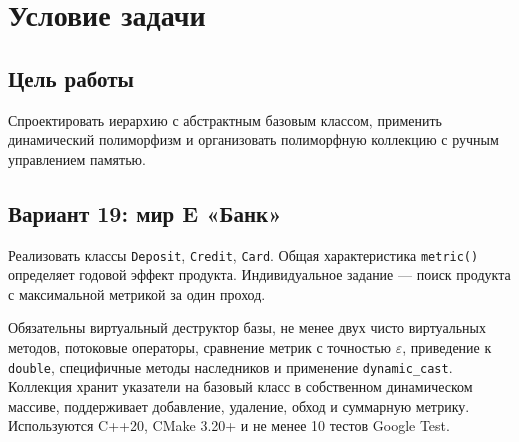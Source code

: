 \section{Условие задачи}

\subsection{Цель работы}
Спроектировать иерархию с абстрактным базовым классом, применить динамический полиморфизм и организовать полиморфную коллекцию с ручным управлением памятью.

\subsection{Вариант 19: мир E «Банк»}
Реализовать классы \texttt{Deposit}, \texttt{Credit}, \texttt{Card}. Общая характеристика \texttt{metric()} определяет годовой эффект продукта. Индивидуальное задание --- поиск продукта с максимальной метрикой за один проход.

Обязательны виртуальный деструктор базы, не менее двух чисто виртуальных методов, потоковые операторы, сравнение метрик с точностью $\varepsilon$, приведение к \texttt{double}, специфичные методы наследников и применение \texttt{dynamic\_cast}. Коллекция хранит указатели на базовый класс в собственном динамическом массиве, поддерживает добавление, удаление, обход и суммарную метрику. Используются C++20, CMake 3.20+ и не менее 10 тестов Google Test.
